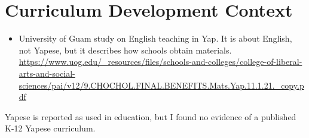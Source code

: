 \documentclass[12pt]{article}
\begin{document}
\section{Curriculum Development Context}
\begin{itemize}
\item University of Guam study on English teaching in Yap. It is about English, not Yapese, but it describes how schools obtain materials. \url{https://www.uog.edu/_resources/files/schools-and-colleges/college-of-liberal-arts-and-social-sciences/pai/v12/9.CHOCHOL.FINAL.BENEFITS.Mats.Yap.11.1.21._copy.pdf}
\end{itemize}
Yapese is reported as used in education, but I found no evidence of a published K-12 Yapese curriculum.
\end{document}
